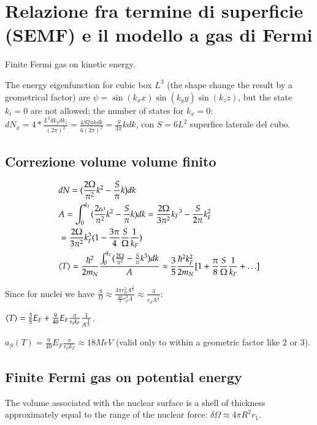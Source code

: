 \documentclass[main.tex]{subfiles}
\begin{document}
\section{Relazione fra termine di superficie (SEMF) e il modello a gas di Fermi}

\begin{enumerate*}
\item Finite Fermi gas on kinetic energy.

The energy eigenfunction for cubic box $L^3$ (the shape change the result by a geometrical factor)  are $\psi=\sin{(k_xx)}\sin{(k_yy)}\sin{(k_zz)}$, but the state $k_i=0$ are not allowed; the number of states for $k_x=0$: $dN_x=4*\frac{L^2dk_ydk_z}{(2\pi)^2}=\frac{4S2\pi kdk}{6(2\pi)^2}=\frac{S}{3\pi}kdk$, con $S=6L^2$ superfice laterale del cubo.

\subsection{Correzione volume volume finito}

\begin{align*}
&dN=(\frac{2\Omega}{\pi^2}k^2-\frac{S}{\pi}k)dk\\
&A=\int_0^{k_F}(\frac{2\omega}{\pi^2}k^2-\frac{S}{\pi}k)dk=\frac{2\Omega}{3\pi^2}{k_F}^3-\frac{S}{2\pi}k_F^2\\
&=\frac{2\Omega}{3\pi^2}k_F^3(1-\frac{3\pi}{4}\frac{S}{\Omega}\frac{1}{k_F})\\
&\langle T \rangle=\frac{\hbar^2}{2m_N}\frac{\int_0^{k_F}(\frac{2\Omega}{\pi^2}-\frac{S}{\pi}k^3)dk}{A}\approx\frac{3}{5}\frac{\hbar^2k_F^2}{2m_N}[1+\frac{\pi}{8}\frac{S}{\Omega}\frac{1}{k_F}+\ldots]
\end{align*}

Since for nuclei we have $\frac{S}{\Omega}\approx\frac{4\pi r_0^2A^{\frac{2}{3}}}{\frac{4\pi}{3}r_0^3A}\approx\frac{3}{r_0A^{\frac{1}{3}}}$:

$\langle T \rangle=\frac{3}{5}E_F+\frac{9}{40}E_F\frac{\pi}{r_0k_F}\frac{1}{A^{\frac{1}{3}}}$.

$a_S(T)=\frac{9}{40}E_F\frac{\pi}{r_0k_F}\approx 18 MeV$ (valid only to within a geometric factor like 2 or 3).

\subsection{Finite Fermi gas on potential energy}
The volume associated with the nuclear surface is a shell of thickness approximately equal to the range of the nuclear force: $\delta\Omega\approx4\pi R^2r_1$.


\end{enumerate*}
\end{document}
